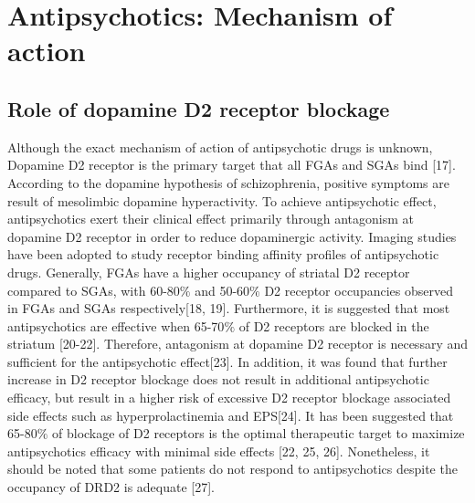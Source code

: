 \documentclass[12pt]{report}
\begin{document}
			\section{Antipsychotics: Mechanism of action}
			\subsection{Role of dopamine D2 receptor blockage}
				Although the exact mechanism of action of antipsychotic drugs is unknown, Dopamine D2 receptor is the primary target that all FGAs and SGAs bind [17]. 
				According to the dopamine hypothesis of schizophrenia, positive symptoms are result of mesolimbic dopamine hyperactivity. 
				To achieve antipsychotic effect, antipsychotics exert their clinical effect primarily through antagonism at dopamine D2 receptor in order to reduce dopaminergic activity.  
				Imaging studies have been adopted to study receptor binding affinity profiles of antipsychotic drugs.
				Generally, FGAs have a higher occupancy of striatal D2 receptor compared to SGAs, with 60-80$\%$ and 50-60$\%$ D2 receptor occupancies observed in FGAs and SGAs respectively[18, 19]. 
				Furthermore, it is suggested that most antipsychotics are effective when 65-70$\%$ of D2 receptors are blocked in the striatum [20-22]. 
				Therefore, antagonism at dopamine D2 receptor is necessary and sufficient for the antipsychotic effect[23]. 
				In addition, it was found that further increase in D2 receptor blockage does not result in additional antipsychotic efficacy, but result in a higher risk of excessive D2 receptor blockage associated side effects such as hyperprolactinemia and EPS[24].  
				It has been suggested that 65-80$\%$ of  blockage of D2 receptors is the optimal therapeutic target to maximize antipsychotics efficacy with minimal side effects [22, 25, 26].  
				Nonetheless, it should be noted that some patients do not respond to antipsychotics despite the occupancy of DRD2 is adequate [27].
\end{document}
